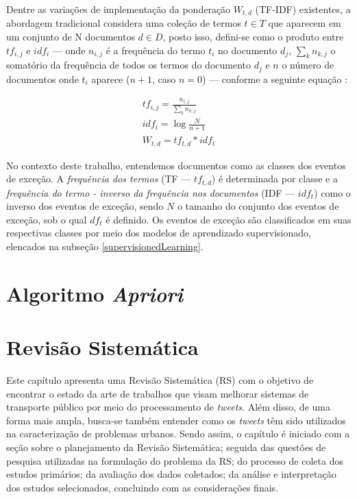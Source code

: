 \documentclass[
	12pt,				%
	oneside,			%
	a4paper,			%
	english,			%
	brazil				%
	]{abntex2ppgsi}
\begin{document}
Dentre as variações de implementação da ponderação $W_{t,d}$ (TF-IDF) existentes, a abordagem tradicional considera uma coleção de termos $t \in T$ que aparecem em um conjunto de N documentos $d \in D$, posto isso, defini-se como o produto entre $tf_{i,j}$ e $idf_i$ --- onde $n_{i,j}$ é a frequência do termo $t_i$ no documento $d_j$, $\sum_k n_{k,j}$ o somatório da frequência de todos os termos do documento $d_j$ e $n$ o número de documentos onde $t_i$ aparece ($n + 1$, caso $n = 0$) --- conforme a seguinte equação \cite{wu2018improved}:

\begin{equation}
\begin{split}
tf_{i,j} = \frac{n_{i,j}}{\sum_k n_{k,j}}
\\
idf_i = \log \frac{N}{n + 1}
\\
W_{t,d} = tf_{t,d} * idf_t
\end{split}
\end{equation}

No contexto deste trabalho, entendemos documentos como as classes dos eventos de exceção. A \emph{frequência dos termos} (TF --- $tf_{t,d}$) é determinada por classe e a \emph{frequência do termo - inverso da frequência nos documentos} (IDF --- $idf_t $) como o inverso dos eventos de exceção, sendo $N$ o tamanho do conjunto dos eventos de exceção, sob o qual $df_t$ é definido. Os eventos de exceção são classificados em suas respectivas classes por meio dos modelos de aprendizado supervisionado, elencados na subseção \ref{supervisionedLearning}. 

\chapter{Algoritmo \textit{Apriori}}
\label{apriori}

\chapter{Revisão Sistemática}
\label{revisao}
Este capítulo apresenta uma Revisão Sistemática (RS) com o objetivo de encontrar o estado da arte de trabalhos que visam melhorar sistemas de transporte público por meio do processamento de \textit{tweets}. Além disso, de uma forma mais ampla, busca-se também entender como os \textit{tweets} têm sido utilizados na caracterização de problemas urbanos. Sendo assim, o capítulo é iniciado com a seção sobre o planejamento da Revisão Sistemática; seguida das questões de pesquisa utilizadas na formulação do problema da RS; do processo de coleta dos estudos primários; da avaliação dos dados coletados; da análise e interpretação dos estudos selecionados, concluindo com as considerações finais.
\end{document}
